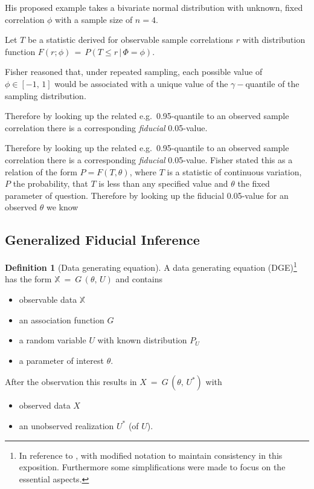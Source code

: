 \documentclass[
]{report}
\theoremstyle{definition}
\theoremstyle{definition}
\newtheorem{definition}{Definition}[section]
\begin{document}
His proposed example takes a bivariate normal distribution with unknown,
fixed correlation \(\phi\) with a sample size of \(n=4\).

Let \(T\) be a statistic derived for observable sample correlations
\(r\) with distribution function
\(F(r; \phi) \, = \, P(T \leq r \, | \, \Phi = \phi)\).

Fisher reasoned that, under repeated sampling, each possible value of
\(\phi \in [-1,\,1]\) would be associated with a unique value of the
\(\gamma-\)quantile of the sampling distribution.

Therefore by looking up the related e.g.~0.95-quantile to an observed
sample correlation there is a corresponding \textit{fiducial}
0.05-value.

Therefore by looking up the related e.g.~0.95-quantile to an observed
sample correlation there is a corresponding \textit{fiducial}
0.05-value. Fisher stated this as a relation of the form
\(P = F(T, \theta)\), where \(T\) is a statistic of continuous
variation, \(P\) the probability, that \(T\) is less than any specified
value and \(\theta\) the fixed parameter of question. Therefore by
looking up the fiducial 0.05-value for an observed \(\theta\) we know

\subsection{Generalized Fiducial Inference}

\begin{definition}[Data generating equation]
A data generating equation (DGE)\footnote{In reference to \cite[Chapters 6.4.1.2 and 13.1]{berger_handbook_2024}, with modified notation to maintain consistency in this exposition. Furthermore some simplifications were made to focus on the essential aspects.} has the form $\mathbb{X} \ = \  G \, (\theta, \, U)$ and contains
\begin{itemize}
  \item observable data $\mathbb{X}$
  \item an association function $G$
  \item a random variable $U$ with known distribution $P_U$
  \item a parameter of interest $\theta$.
\end{itemize}
After the observation this results in $X \ = \ G \, (\theta, \, U^*)$ with
\begin{itemize}
  \item observed data $X$
  \item an unobserved realization $U^*$ (of $U$).
\end{itemize}
\end{definition}
\end{document}
